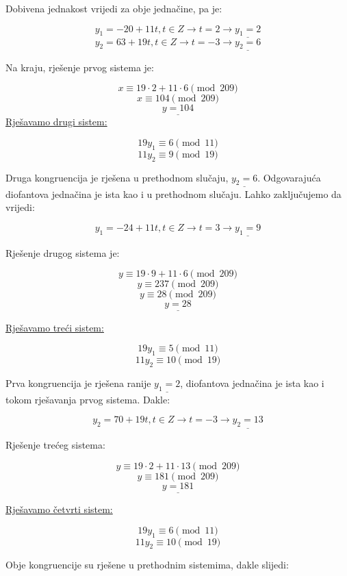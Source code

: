 \documentclass[12pt]{article}
\begin{document}
Dobivena jednakost vrijedi za obje jednačine, pa je:

$$y_{1} = -20 + 11t, t \in Z \to t = 2 \to \underline{y_{1} = 2}$$
$$y_{2} = 63 + 19t, t \in Z \to t = -3 \to \underline{y_{2} = 6}$$\vspace{1mm}

Na kraju, rješenje prvog sistema je:

$$x \equiv 19 \cdot 2 + 11 \cdot 6 \pmod{209}$$
$$x \equiv 104 \pmod{209}$$
$$\underline{y = 104}$$\vspace{1mm}
\newpage
\underline{Rješavamo drugi sistem:}

$$19y_{1} \equiv 6 \pmod{11}$$
$$11y_{2} \equiv 9 \pmod{19}$$\vspace{1mm}

Druga kongruencija je rješena u prethodnom slučaju, $\underline{y_{2} = 6}$. Odgovarajuća diofantova jednačina je ista kao i u prethodnom slučaju. Lahko zaključujemo da vrijedi:

$$y_{1} = -24 + 11t, t \in Z \to t = 3 \to \underline{y_{1} = 9}$$\vspace{1mm}

Rješenje drugog sistema je:

$$y \equiv 19 \cdot 9 + 11 \cdot 6 \pmod{209}$$
$$y \equiv 237 \pmod{209}$$
$$y \equiv 28 \pmod{209}$$
$$\underline{y = 28}$$\vspace{1mm}

\underline{Rješavamo treći sistem:}

$$19y_{1} \equiv 5 \pmod{11}$$
$$11y_{2} \equiv 10 \pmod{19}$$\vspace{1mm}

Prva kongruencija je rješena ranije $\underline{y_{1} = 2}$, diofantova jednačina je ista kao i tokom rješavanja prvog sistema. Dakle:

$$y_{2} = 70 + 19t, t \in Z \to t = -3 \to \underline{y_{2} = 13}$$\vspace{1mm}

Rješenje trećeg sistema:

$$y \equiv 19 \cdot 2 + 11 \cdot 13 \pmod{209}$$
$$y \equiv 181 \pmod{209}$$
$$\underline{y = 181}$$\vspace{1mm}

\underline{Rješavamo četvrti sistem:}

$$19y_{1} \equiv 6 \pmod{11}$$
$$11y_{2} \equiv 10 \pmod{19}$$\vspace{1mm}

Obje kongruencije su rješene u prethodnim sistemima, dakle slijedi:
\end{document}
